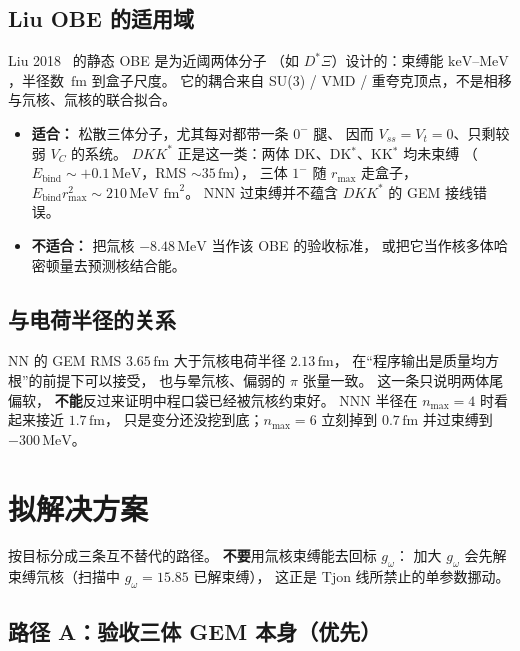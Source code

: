 \documentclass[12pt,a4paper]{article}
\newcommand{\MeV}{\,\mathrm{MeV}}
\newcommand{\fm}{\,\mathrm{fm}}
\begin{document}
\subsection{Liu OBE 的适用域}

Liu 2018~\cite{Liu2018} 的静态 OBE 是为近阈两体分子
（如 $D^*\Xi$）设计的：束缚能 $\mathrm{keV}$--$\mathrm{MeV}$，半径数 $\fm$ 到盒子尺度。
它的耦合来自 SU(3) / VMD / 重夸克顶点，不是相移与氘核、氚核的联合拟合。

\begin{itemize}
  \item \textbf{适合：} 松散三体分子，尤其每对都带一条 $0^-$ 腿、
        因而 $V_{ss}=V_t=0$、只剩较弱 $V_C$ 的系统。
        $DKK^*$ 正是这一类：两体 DK、DK$^*$、KK$^*$ 均未束缚
        （$E_{\mathrm{bind}}\sim +0.1\MeV$，RMS $\sim 35\fm$），
        三体 $1^-$ 随 $r_{\max}$ 走盒子，
        $E_{\mathrm{bind}}r_{\max}^2\sim 210\MeV\,\fm^2$。
        NNN 过束缚并不蕴含 $DKK^*$ 的 GEM 接线错误。
  \item \textbf{不适合：} 把氚核 $-8.48\MeV$ 当作该 OBE 的验收标准，
        或把它当作核多体哈密顿量去预测核结合能。
\end{itemize}

\subsection{与电荷半径的关系}

NN 的 GEM RMS $3.65\fm$ 大于氘核电荷半径 $2.13\fm$，
在``程序输出是质量均方根''的前提下可以接受，
也与晕氘核、偏弱的 $\pi$ 张量一致。
这一条只说明两体尾偏软，
\textbf{不能}反过来证明中程口袋已经被氘核约束好。
NNN 半径在 $n_{\max}=4$ 时看起来接近 $1.7\fm$，
只是变分还没挖到底；$n_{\max}=6$ 立刻掉到 $0.7\fm$ 并过束缚到 $-300\MeV$。

\section{拟解决方案}

按目标分成三条互不替代的路径。
\textbf{不要}用氚核束缚能去回标 $g_\omega$：
加大 $g_\omega$ 会先解束缚氘核（扫描中 $g_\omega=15.85$ 已解束缚），
这正是 Tjon 线所禁止的单参数挪动。

\subsection{路径 A：验收三体 GEM 本身（优先）}
\end{document}
